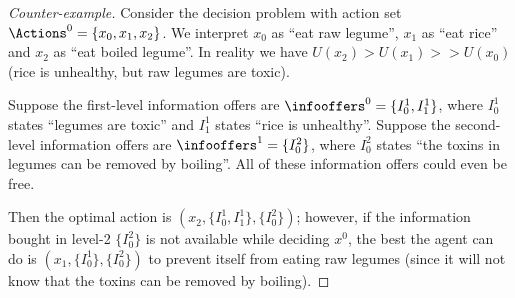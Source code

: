 \begin{proof}[Counter-example]
Consider the decision problem with action set $\Actions^0=\{x_0, x_1, x_2\}$. We interpret $x_0$ as ``eat raw legume'', $x_1$ as ``eat rice'' and $x_2$ as ``eat boiled legume''. In reality we have $U(x_2)>U(x_1)>>U(x_0)$ (rice is unhealthy, but raw legumes are toxic).

Suppose the first-level information offers are $\infooffers^0=\{I^1_0,I^1_1\}$, where $I^1_0$ states ``legumes are toxic'' and $I^1_1$ states ``rice is unhealthy''. Suppose the second-level information offers are $\infooffers^1=\{I^2_0\}$, where $I^2_0$ states ``the toxins in legumes can be removed by boiling''. All of these information offers could even be free.

Then the optimal action is $(x_2,\{I^1_0,I^1_1\},\{I^2_0\})$; however, if the information bought in level-2 $\{I^2_0\}$ is not available while deciding $x^0$, the best the agent can do is $(x_1,\{I^1_0\},\{I^2_0\})$ to prevent itself from eating raw legumes (since it will not know that the toxins can be removed by boiling).
\end{proof}










